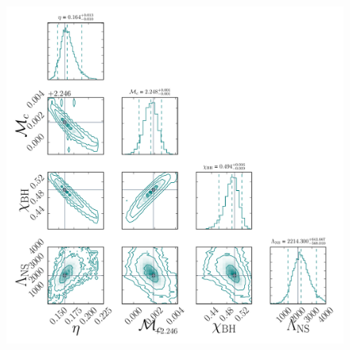 \documentclass[aps,prd,amsmath,floats,floatfix, twocolumn,
superscriptaddress,nofootinbib,showpacs]{revtex4-1}
\newcommand{\lambdans}{\Lambda_\mathrm{NS}}
\newcommand{\chibh}{\chi_\mathrm{BH}}
\newcommand{\mbh}{m_\mathrm{BH}}
\newcommand{\mns}{m_\mathrm{NS}}
\begin{document}
\begin{appendix}
\begin{figure}
\includegraphics[width=1.05\columnwidth,trim=2cm 0 0 0]{plots/AllParamsMcEtPDF1D2D_q4_mc2_25_chi0_50_snr50}%
\caption{%
}
\end{figure}
\end{appendix}
\end{document}
